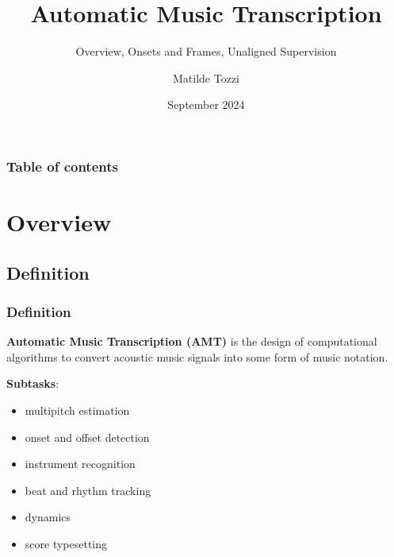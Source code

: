 \documentclass{beamer}
\title{Automatic Music Transcription}
\subtitle{Overview, Onsets and Frames, Unaligned Supervision}
\author{Matilde Tozzi}
\institute[]{Ferienakademie}
\date[September 2024]{September 2024}
\newcommand{\emp}[1]{\textcolor{tum}{\textbf{#1}}}
\begin{document}
\beamertemplatenavigationsymbolsempty

\begin{frame}
	\titlepage
\end{frame}

\begin{frame}
	\frametitle{Table of contents}
	\tableofcontents
\end{frame}


\section{Overview}
\subsection{Definition}
\begin{frame}
	\frametitle{Definition}
	\begin{block}{}
		\emp{Automatic Music Transcription (AMT)} is the design of computational algorithms to convert acoustic music signals into some form of music notation. \cite{Overview}
	\end{block}

	\emp{Subtasks}:
	\begin{itemize}
		\item multipitch estimation
		\item onset and offset detection
		\item instrument recognition
		\item beat and rhythm tracking
		\item dynamics
		\item score typesetting
	\end{itemize}
\end{frame}
\end{document}
